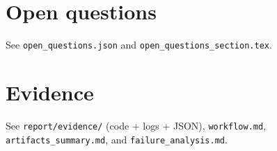\documentclass[11pt]{article}
\begin{document}
\section{Open questions}
See \texttt{open\_questions.json} and \texttt{open\_questions\_section.tex}.

\section{Evidence}
See \texttt{report/evidence/} (code + logs + JSON), \texttt{workflow.md}, \texttt{artifacts\_summary.md}, and \texttt{failure\_analysis.md}.
\end{document}
